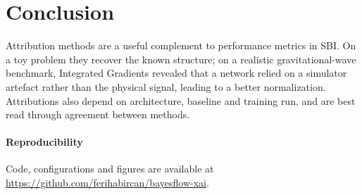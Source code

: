 \documentclass[conference]{IEEEtran}
\begin{document}
\section{Conclusion}

Attribution methods are a useful complement to performance metrics in SBI. On a toy problem they recover the
known structure; on a realistic gravitational-wave benchmark, Integrated Gradients revealed that a network relied
on a simulator artefact rather than the physical signal, leading to a better normalization. Attributions also
depend on architecture, baseline and training run, and are best read through agreement between methods.

\paragraph{Reproducibility} Code, configurations and figures are available at
\url{https://github.com/ferihabircan/bayesflow-xai}.
\end{document}
